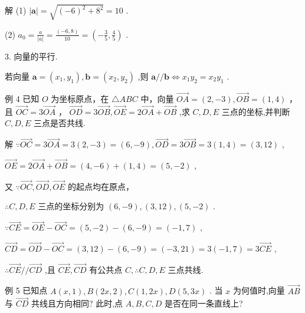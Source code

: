 \documentclass[10pt]{article}
\begin{document}
解 (1) \(\left| \mathbf{a}\right|  = \sqrt{{\left( -6\right) }^{2} + {8}^{2}} = {10}\) .

(2) \({a}_{0} = \frac{a}{\left| a\right| } = \frac{\left( -6,8\right) }{10} = \left( {-\frac{3}{5},\frac{4}{5}}\right)\) .

3. 向量的平行.

若向量 \(\mathbf{a} = \left( {{x}_{1},{y}_{1}}\right) ,\mathbf{b} = \left( {{x}_{2},{y}_{2}}\right)\) ,则 \(\mathbf{a}//\mathbf{b} \Leftrightarrow  {x}_{1}{y}_{2} = {x}_{2}{y}_{1}\) .

例 4 已知 \(O\) 为坐标原点，在 \(\bigtriangleup  {ABC}\) 中，向量 \(\overrightarrow{OA} = \left( {2, - 3}\right) ,\overrightarrow{OB} = \left( {1,4}\right)\) ，且 \(\overrightarrow{OC} = 3\overrightarrow{OA}\) ， \(\overrightarrow{OD} = 3\overrightarrow{OB},\overrightarrow{OE} = 2\overrightarrow{OA} + \overrightarrow{OB}\) ,求 \(C,D,E\) 三点的坐标,并判断 \(C,D,E\) 三点是否共线.

解 \(\because \overrightarrow{OC} = 3\overrightarrow{OA} = 3\left( {2, - 3}\right)  = \left( {6, - 9}\right) ,\overrightarrow{OD} = 3\overrightarrow{OB} = 3\left( {1,4}\right)  = \left( {3,{12}}\right)\) ,

\(\overrightarrow{OE} = 2\overrightarrow{OA} + \overrightarrow{OB} = \left( {4, - 6}\right)  + \left( {1,4}\right)  = \left( {5, - 2}\right)\) ,

又 \(\because \overrightarrow{OC},\overrightarrow{OD},\overrightarrow{OE}\) 的起点均在原点，

\(\therefore C,D,E\) 三点的坐标分别为 \(\left( {6, - 9}\right) ,\left( {3,{12}}\right) ,\left( {5, - 2}\right)\) .

\(\because \overrightarrow{CE} = \overrightarrow{OE} - \overrightarrow{OC} = \left( {5, - 2}\right)  - \left( {6, - 9}\right)  = \left( {-1,7}\right)\) ,

\(\overrightarrow{CD} = \overrightarrow{OD} - \overrightarrow{OC} = \left( {3,{12}}\right)  - \left( {6, - 9}\right)  = \left( {-3,{21}}\right)  = 3\left( {-1,7}\right)  = 3\overrightarrow{CE}\) ,

\(\therefore \overrightarrow{CE}//\overrightarrow{CD}\) ,且 \(\overrightarrow{CE},\overrightarrow{CD}\) 有公共点 \(C,\therefore C,D,E\) 三点共线.

例 5 已知点 \(A\left( {x,1}\right) ,B\left( {{2x},2}\right) ,C\left( {1,{2x}}\right) ,D\left( {5,{3x}}\right)\) . 当 \(x\) 为何值时,向量 \(\overrightarrow{AB}\) 与 \(\overrightarrow{CD}\) 共线且方向相同? 此时,点 \(A,B,C,D\) 是否在同一条直线上?
\end{document}
